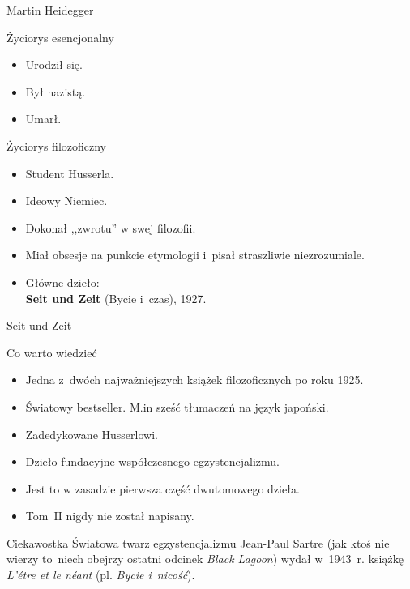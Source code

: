 \documentclass{beamer}  %
\begin{document}
\begin{frame}{Martin Heidegger}

  \begin{block}{Życiorys esencjonalny}
    \begin{itemize}
    \item Urodził się.
    \item Był nazistą.
    \item Umarł.
    \end{itemize}
  \end{block}

  \begin{block}{Życiorys filozoficzny}
    \begin{itemize}
      \pause
    \item Student Husserla.
    \item Ideowy Niemiec.
    \item Dokonał ,,zwrotu'' w swej filozofii.
    \item Miał obsesje na punkcie etymologii i~pisał straszliwie
      niezrozumiale.
    \item Główne dzieło: \\
      \textbf{Seit und Zeit} (Bycie i~czas), 1927.
    \end{itemize}
  \end{block}

\end{frame}



\begin{frame}{Seit und Zeit}

  \begin{block}{Co warto wiedzieć}
    \begin{itemize}
    \item Jedna z~dwóch najważniejszych książek filozoficznych po roku
      1925.
    \item Światowy bestseller. M.in sześć tłumaczeń na język japoński.
    \item Zadedykowane Husserlowi.
    \item Dzieło fundacyjne współczesnego egzystencjalizmu.
    \item Jest to w zasadzie pierwsza część dwutomowego dzieła.
    \item Tom~II nigdy nie został napisany.
    \end{itemize}
  \end{block}
  \pause

  \begin{block}{Ciekawostka}
    \pause Światowa twarz egzystencjalizmu Jean-Paul Sartre (jak ktoś
    nie wierzy to~niech obejrzy ostatni odcinek \emph{Black Lagoon})
    wydał w~1943~r. książkę \emph{L'étre et le néant} (pl. \emph{Bycie
      i~nicość}).
  \end{block}

\end{frame}
\end{document}
